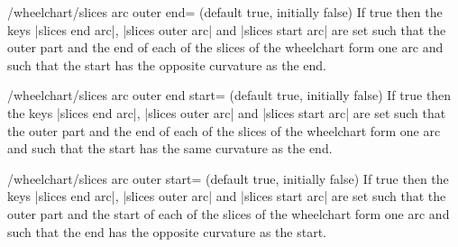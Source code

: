 \documentclass[a4paper,english,dvipsnames]{ltxdoc}
\begin{document}
\begin{key}{/wheelchart/slices arc outer end= (default true, initially false)}
If true then the keys |slices end arc|, |slices outer arc| and |slices start arc| are set such that the outer part and the end of each of the slices of the wheelchart form one arc and such that the start has the opposite curvature as the end.
\end{key}
\begin{key}{/wheelchart/slices arc outer end start= (default true, initially false)}
If true then the keys |slices end arc|, |slices outer arc| and |slices start arc| are set such that the outer part and the end of each of the slices of the wheelchart form one arc and such that the start has the same curvature as the end.
\begin{codeexample}[width=10cm]
\begin{tikzpicture}
\wheelchart[
    data=,
    gap polar=5,
    middle={%
        slices arc\\%
        outer end start%
    },
    middle style={font=\ttfamily},
    slices arc outer end start,
    value=1,
    wheel data=\WCvarC
]{\exampleforthismanual}
\end{tikzpicture}
\end{codeexample}
\end{key}
\begin{key}{/wheelchart/slices arc outer start= (default true, initially false)}
If true then the keys |slices end arc|, |slices outer arc| and |slices start arc| are set such that the outer part and the start of each of the slices of the wheelchart form one arc and such that the end has the opposite curvature as the start.
\begin{codeexample}[width=10cm]
\begin{tikzpicture}
\wheelchart[
    data=,
    gap=0.1,
    slices arc inner start,
    slices arc outer start,
    slices style={
        \WCvarB!50,
        draw=\WCvarB,
        ultra thick
    },
    value=1,
    wheel data=\WCcount,
    wheel data pos=0.8
]{\exampleforthismanual}
\end{tikzpicture}
\end{codeexample}
\begin{codeexample}[]
\end{codeexample}
\end{key}
\end{document}
